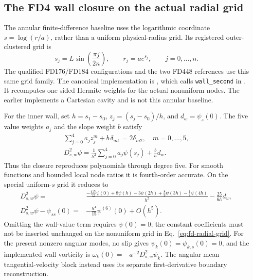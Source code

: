 \subsection{The FD4 wall closure on the actual radial grid}
\label{sec:fd-wall-closure}

The annular finite-difference baseline uses the logarithmic coordinate $s=\log(r/a)$, rather than a uniform physical-radius grid. Its registered outer-clustered grid is
\begin{equation}
 s_j=L\sin\!\left(\frac{\pi j}{2n}\right),\qquad
 r_j=a e^{s_j},\qquad j=0,\ldots,n.
 \label{eq:fd-radial-grid}
\end{equation}
The qualified FD176/FD184 configurations and the two FD448 references use this same grid family. The canonical implementation is , which calls \texttt{wall\_second} in . It recomputes one-sided Hermite weights for the actual nonuniform nodes. The earlier  implements a Cartesian cavity and is not this annular baseline.

For the inner wall, set $h=s_1-s_0$, $z_j=(s_j-s_0)/h$, and $d_w=\psi_s(0)$. The five value weights $a_j$ and the slope weight $b$ satisfy
\begin{equation}
 \begin{gathered}
 \sum_{j=0}^{4}a_j z_j^m+b\,\delta_{m1}=2\delta_{m2},
 \quad m=0,\ldots,5,\\
 D_{s,w}^2\psi=\frac{1}{h^2}\sum_{j=0}^{4}a_j\psi(s_j)
                     +\frac{b}{h}d_w.
 \end{gathered}
 \label{eq:fd-hermite-moments}
\end{equation}
Thus the closure reproduces polynomials through degree five. For smooth functions and bounded local node ratios it is fourth-order accurate. On the special uniform-$s$ grid it reduces to
\begin{equation}
 \begin{split}
 D_{s,w}^2\psi={}&\frac{-\frac{415}{72}\psi(0)+8\psi(h)-3\psi(2h)
                         +\frac89\psi(3h)-\frac18\psi(4h)}{h^2}
                    -\frac{25}{6h}d_w,\\
 D_{s,w}^2\psi-\psi_{ss}(0)={}&-\frac{h^4}{15}\psi^{(6)}(0)+O(h^5).
 \end{split}
 \label{eq:fd-uniform-wall}
\end{equation}
Omitting the wall-value term requires $\psi(0)=0$; the constant coefficients must not be inserted unchanged on the nonuniform grid in Eq.~\eqref{eq:fd-radial-grid}. For the present nonzero angular modes, no slip gives $\psi_k(0)=\psi_{k,s}(0)=0$, and the implemented wall vorticity is $\omega_k(0)=-a^{-2}D_{s,w}^2\psi_k$. The angular-mean tangential-velocity block instead uses its separate first-derivative boundary reconstruction.

